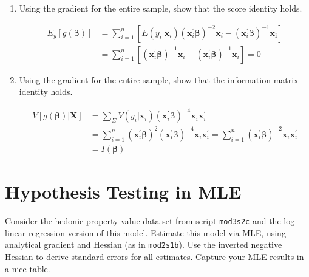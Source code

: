 \documentclass[11pt,reqno]{amsart}   %
\begin{document}
\begin{enumerate}
\item Using the gradient for the entire sample, show that the score identity holds.

\begin{equation*}
\begin{split}
E_{y}[g(\boldsymbol{\beta})]&=\sum_{i=1}^{n}\left[E\left(y_{i} | \mathbf{x}_{i}\right)\left(\mathbf{x}_{i}^{\prime} \boldsymbol{\beta}\right)^{-2} \mathbf{x}_{i}-\left(\mathbf{x}_{i}^{\prime} \boldsymbol{\beta}\right)^{-1} \mathbf{x}_{\mathbf{i}}\right] \\
&= \sum_{i=1}^{n}\left[\left(\mathbf{x}_{i}^{\prime} \boldsymbol{\beta}\right)^{-1} \mathbf{x}_{i}-\left(\mathbf{x}_{i}^{\prime} \boldsymbol{\beta}\right)^{-1} \mathbf{x}_{i}\right]=0
\end{split}
\end{equation*}

\item Using the gradient for the entire sample, show that the information matrix identity holds.

\begin{equation*}
\begin{split}
V[g(\boldsymbol{\beta}) | \mathbf{X}]&=\sum_{\Sigma} V\left(y_{i} | \mathbf{x}_{i}\right)\left(\mathbf{x}_{i}^{\prime} \boldsymbol{\beta}\right)^{-4} \mathbf{x}_{i} \mathbf{x}_{i}^{\prime}\\
&=\sum_{i=1}^{n}\left(\mathbf{x}_{i}^{\prime} \boldsymbol{\beta}\right)^{2}\left(\mathbf{x}_{i}^{\prime} \boldsymbol{\beta}\right)^{-4} \mathbf{x}_{i} \mathbf{x}_{i}^{\prime} = \sum_{i=1}^{n}\left(\mathbf{x}_{i}^{\prime} \boldsymbol{\beta}\right)^{-2} \mathbf{x}_{i} \mathbf{x}_{i}^{\prime}\\& = I(\boldsymbol{\beta})
\end{split}
\end{equation*}
\end{enumerate}

\section{Hypothesis Testing in MLE}
Consider the hedonic property value data set from script \texttt{mod3s2c} and 
the log-linear regression version of this model.  Estimate this model via MLE,  
using analytical gradient and Hessian (as in \texttt{mod2s1b}). 
Use the inverted negative Hessian to derive standard errors for all estimates. 
Capture your MLE results in a nice table.\\
\end{document}
